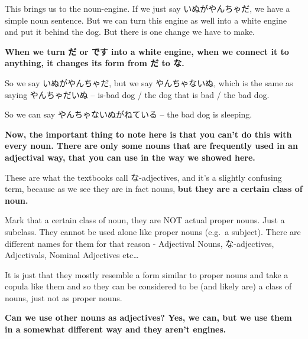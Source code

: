 {}

\stopsectionlevel

\startsectionlevel[title={Using adjectival-nouns as adjectives},reference={using-adjectival-nouns-as-adjectives}]

This brings us to the noun-engine. If we just say いぬがやんちゃだ, we have a simple noun sentence. But we can turn this engine as well into a white engine and put it behind the dog. But there is one change we have to make.

{\bf When we turn だ or です into a white engine, when we connect it to anything, it changes its form from だ to な.}

{}

So we say いぬがやんちゃだ, but we say やんちゃないぬ, which is the same as saying やんちゃだいぬ -- is-bad dog / the dog that is bad / the bad dog.

So we can say やんちゃないぬがねている -- the bad dog is sleeping.

{}

{\bf Now, the important thing to note here is that you can't do this with every noun. There are only some nouns that are frequently used in an adjectival way, that you can use in the way we showed here.}

These are what the textbooks call な-adjectives, and it's a slightly confusing term, because as we see they are in fact nouns, {\bf but they are a certain class of noun.}

Mark that a certain class of noun, they are NOT actual proper nouns. Just a subclass. They cannot be used alone like proper nouns (e.g.~a subject). There are different names for them for that reason - Adjectival Nouns, な-adjectives, Adjectivals, Nominal Adjectives etc\ldots{}

It is just that they mostly resemble a form similar to proper nouns and take a copula like them and so they can be considered to be (and likely are) a class of nouns, just not as proper nouns.

\thinrule

{\bf Can we use other nouns as adjectives? Yes, we can, but we use them in a somewhat different way and they aren't engines.}

{}

\stopsectionlevel

\startsectionlevel[title={The の car},reference={the-の-car}]

